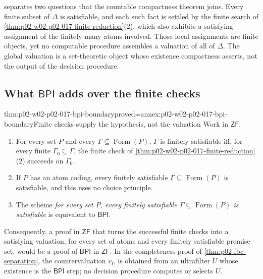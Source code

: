  separates two
questions that the countable compactness theorem joins.  Every finite
subset of \(\Delta\) is satisfiable, and each such fact is settled by
the finite search of \cref{thm:p02-w02-p02-017-finite-reduction}(2),
which also exhibits a satisfying assignment of the finitely many atoms
involved.  Those local assignments are finite objects, yet no computable
procedure assembles a valuation of all of \(\Delta\).  The global valuation is a set-theoretic object whose
existence compactness asserts, not the output of the decision procedure.

\subsection{What \texorpdfstring{\(\mathsf{BPI}\)}{BPI} adds over the finite checks}
\label{sec:p02-w02-p02-017-bpi-adds}

\begin{hbtheorem}{thm:p02-w02-p02-017-bpi-boundary}{proved=annex:p02-w02-p02-017-bpi-boundary}{Finite checks supply the hypothesis, not the valuation}
Work in \(\mathsf{ZF}\).
\begin{enumerate}
 \item For every set \(P\) and every
       \(\Gamma\subseteq\operatorname{Form}(P)\), \(\Gamma\) is finitely
       satisfiable iff, for every finite \(\Gamma_0\subseteq\Gamma\), the
       finite check of \cref{thm:p02-w02-p02-017-finite-reduction}(2)
       succeeds on \(\Gamma_0\).
 \item If \(P\) has an atom coding, every finitely satisfiable
       \(\Gamma\subseteq\operatorname{Form}(P)\) is satisfiable, and this
       uses no choice principle.
 \item The scheme \emph{for every set \(P\), every finitely satisfiable
       \(\Gamma\subseteq\operatorname{Form}(P)\) is satisfiable} is
       equivalent to \(\mathsf{BPI}\).
\end{enumerate}
Consequently, a proof in \(\mathsf{ZF}\) that turns the successful finite
checks into a satisfying valuation, for every set of atoms and every
finitely satisfiable premise set, would be a proof of \(\mathsf{BPI}\) in
\(\mathsf{ZF}\).  In the completeness proof of
\cref{thm:p02-fbc-separation}, the countervaluation \(v_U\) is obtained
from an ultrafilter \(U\) whose existence is the \(\mathsf{BPI}\) step;
no decision procedure computes or selects \(U\).
\end{hbtheorem}

